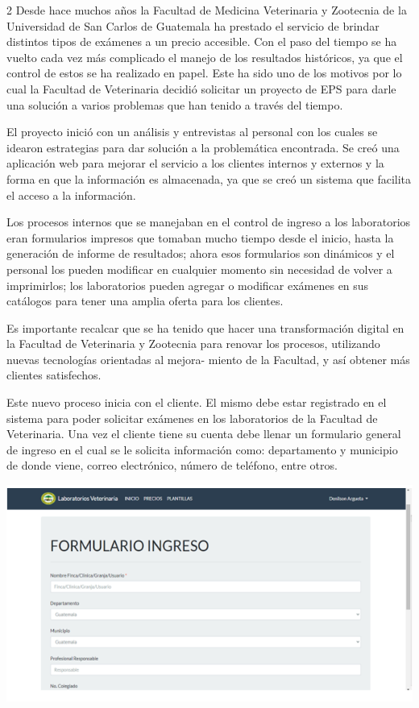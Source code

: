 \documentclass[12pt,spanish,Letterpaper,openany]{book}
\begin{document}
\begin {multicols}{2}
Desde hace muchos años la Facultad de Medicina Veterinaria y Zootecnia de la Universidad de San Carlos de Guatemala ha prestado el servicio de brindar distintos tipos de exámenes a un precio accesible. Con el paso del tiempo se ha vuelto cada vez más complicado el manejo de los resultados históricos, ya que el control de estos se ha realizado en papel. Este ha sido uno de los motivos por lo cual la Facultad de Veterinaria decidió solicitar un proyecto de EPS para darle una solución a varios problemas que han tenido a través del tiempo.

El proyecto inició con un análisis y entrevistas al personal con los cuales se idearon estrategias para dar solución a la problemática encontrada. Se creó una aplicación web para mejorar el servicio a los clientes internos y externos y la forma en que la información es almacenada, ya que se creó un sistema que facilita el acceso a la información.

Los procesos internos que se manejaban en el control de ingreso a los laboratorios eran formularios impresos que tomaban mucho tiempo desde el inicio, hasta la generación de informe de resultados; ahora esos formularios son dinámicos y el personal los pueden modificar en cualquier momento sin necesidad de volver a imprimirlos; los laboratorios pueden agregar o modificar exámenes en sus catálogos para tener una amplia oferta para los clientes.

Es importante recalcar que se ha tenido que hacer una transformación digital en la Facultad de Veterinaria y Zootecnia para renovar los procesos, utilizando nuevas tecnologías orientadas al mejora-
miento de la Facultad, y así obtener más clientes satisfechos.

Este nuevo proceso inicia con el cliente. El mismo debe estar registrado en el sistema para poder solicitar exámenes en los laboratorios de la Facultad de Veterinaria. Una vez el cliente tiene su cuenta debe llenar un formulario general de ingreso en el cual se le solicita información como: departamento y municipio de donde viene, correo electrónico, número de teléfono, entre otros.

\begin {flushleft}
\noindent\begin{minipage}[c]{\columnwidth}

\includegraphics[width=1\linewidth]{images/denilson_01}


\end{minipage}
\end{flushleft}
\end{multicols}
\end{document}
